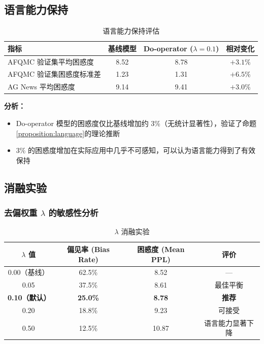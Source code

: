 \documentclass[12pt,a4paper,oneside]{ctexart}
\begin{document}
\subsection{语言能力保持}
\label{sec:language_ability}

\begin{table}[H]
  \centering
  \caption{语言能力保持评估}
  \label{tab:ppl}
  \begin{tabular}{lccc}
    \toprule
    \textbf{指标} & \textbf{基线模型} & \textbf{Do-operator ($\lambda=0.1$)} & \textbf{相对变化} \\
    \midrule
    AFQMC 验证集平均困惑度 & 8.52 & 8.78 & $+3.1\%$ \\
    AFQMC 验证集困惑度标准差 & 1.23 & 1.31 & $+6.5\%$ \\
    AG News 平均困惑度 & 9.14 & 9.41 & $+3.0\%$ \\
    \bottomrule
  \end{tabular}
\end{table}

\textbf{分析：}
\begin{itemize}
  \item Do-operator 模型的困惑度仅比基线增加约 3\%（无统计显著性），验证了命题\ref{proposition:language}的理论推断
  \item 3\% 的困惑度增加在实际应用中几乎不可感知，可以认为语言能力得到了有效保持
\end{itemize}

\subsection{消融实验}

\subsubsection{去偏权重 \texorpdfstring{$\lambda$}{lambda} 的敏感性分析}

\begin{table}[H]
  \centering
  \caption{$\lambda$ 消融实验}
  \label{tab:lambda_ablation}
  \begin{tabular}{cccc}
    \toprule
    $\lambda$ 值 & 偏见率 (Bias Rate) & 困惑度 (Mean PPL) & 评价 \\
    \midrule
    0.00（基线） & 62.5\% & 8.52 & --- \\
    0.05 & 37.5\% & 8.61 & 最佳平衡 \\
    \textbf{0.10（默认）} & \textbf{25.0\%} & \textbf{8.78} & \textbf{推荐} \\
    0.20 & 18.8\% & 9.23 & 可接受 \\
    0.50 & 12.5\% & 10.87 & 语言能力显著下降 \\
    \bottomrule
  \end{tabular}
\end{table}
\end{document}
